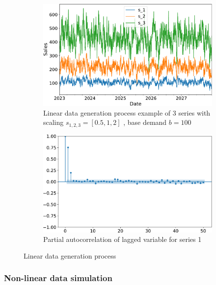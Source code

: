 \begin{figure}[t]
    \centering
    \begin{subfigure}[t]{0.45\textwidth}
        \includegraphics[width=\textwidth]{chapters/04_feature_importance_estimation/img/linear_dep_time_series}
        \caption{Linear data generation process example of 3 series with scaling $s_{1,2,3} = [0.5,1,2]$ , base demand $b=100$}
        \label{fig:linear_data_generation}
    \end{subfigure}%
    \hfill
    \begin{subfigure}[t]{0.45\textwidth}
        \centering
        \includegraphics[width=\textwidth]{chapters/04_feature_importance_estimation/img/linear_dep_time_series_acf_pacf_s_1}
        \caption{Partial autocorrelation of lagged variable for series 1}
        \label{fig:partialautocorrelation}
    \end{subfigure}
    \caption{Linear data generation process}
\end{figure}

\subsubsection{Non-linear data simulation}
\label{sec:non-linear-data-simulation}



